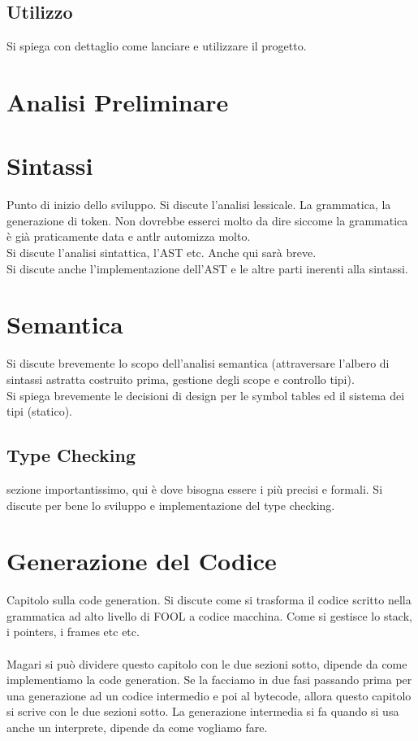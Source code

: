 \documentclass{scrreprt}
\begin{document}
\section{Utilizzo}
Si spiega con dettaglio come lanciare e utilizzare il progetto.

\chapter{Analisi Preliminare}

\chapter{Sintassi}
Punto di inizio dello sviluppo. Si discute l'analisi lessicale. La grammatica, la generazione di token.
Non dovrebbe esserci molto da dire siccome la grammatica è già praticamente data e antlr automizza molto.\\
Si discute l'analisi sintattica, l'AST etc. Anche qui sarà breve.\\
Si discute anche l'implementazione dell'AST e le altre parti inerenti alla sintassi.

\chapter{Semantica}
Si discute brevemente lo scopo dell'analisi semantica (attraversare l'albero di sintassi astratta costruito prima, gestione
degli scope e controllo tipi).\\
Si spiega brevemente le decisioni di design per le symbol tables ed il sistema dei tipi (statico).
\section{Type Checking}
sezione importantissimo, qui è dove bisogna essere i più precisi e formali. Si discute per bene lo sviluppo
e implementazione del type checking.

\chapter{Generazione del Codice}
Capitolo sulla code generation. Si discute come si trasforma il codice scritto nella grammatica
ad alto livello di FOOL a codice macchina. Come si gestisce lo stack, i pointers, i frames etc etc.\\
\\
Magari si può dividere questo capitolo con le due sezioni sotto, dipende da come implementiamo la code 
generation. Se la facciamo in due fasi passando prima per una generazione ad un codice intermedio e 
poi al bytecode, allora questo capitolo si scrive con le due sezioni sotto.
La generazione intermedia si fa quando si usa anche un interprete, dipende da come vogliamo fare.
\end{document}
